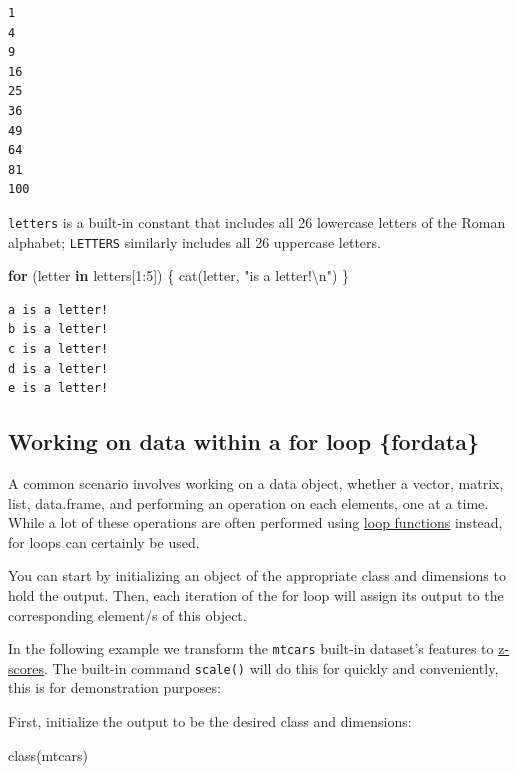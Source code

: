 \documentclass[
]{book}
\newenvironment{Shaded}{\begin{snugshade}}{\end{snugshade}}
\newcommand{\ControlFlowTok}[1]{\textcolor[rgb]{0.13,0.29,0.53}{\textbf{#1}}}
\newcommand{\DecValTok}[1]{\textcolor[rgb]{0.00,0.00,0.81}{#1}}
\newcommand{\FunctionTok}[1]{\textcolor[rgb]{0.00,0.00,0.00}{#1}}
\newcommand{\NormalTok}[1]{#1}
\newcommand{\SpecialCharTok}[1]{\textcolor[rgb]{0.00,0.00,0.00}{#1}}
\newcommand{\StringTok}[1]{\textcolor[rgb]{0.31,0.60,0.02}{#1}}
\begin{document}
\begin{verbatim}
1 
4 
9 
16 
25 
36 
49 
64 
81 
100 
\end{verbatim}

\texttt{letters} is a built-in constant that includes all 26 lowercase letters of the Roman alphabet; \texttt{LETTERS} similarly includes all 26 uppercase letters.

\begin{Shaded}
\begin{Highlighting}[]
\ControlFlowTok{for}\NormalTok{ (letter }\ControlFlowTok{in}\NormalTok{ letters[}\DecValTok{1}\SpecialCharTok{:}\DecValTok{5}\NormalTok{]) \{}
  \FunctionTok{cat}\NormalTok{(letter, }\StringTok{"is a letter!}\SpecialCharTok{\textbackslash{}n}\StringTok{"}\NormalTok{)}
\NormalTok{\}}
\end{Highlighting}
\end{Shaded}

\begin{verbatim}
a is a letter!
b is a letter!
c is a letter!
d is a letter!
e is a letter!
\end{verbatim}

\hypertarget{working-on-data-within-a-for-loop-fordata}{%
\subsection{Working on data within a for loop \{fordata\}}\label{working-on-data-within-a-for-loop-fordata}}

A common scenario involves working on a data object, whether a vector, matrix, list, data.frame, and performing an operation on each elements, one at a time. While a lot of these operations are often performed using \protect\hyperlink{loopfns}{loop functions} instead, for loops can certainly be used.

You can start by initializing an object of the appropriate class and dimensions to hold the output. Then, each iteration of the for loop will assign its output to the corresponding element/s of this object.

In the following example we transform the \texttt{mtcars} built-in dataset's features to \protect\hyperlink{zscore}{z-scores}.
The built-in command \texttt{scale()} will do this for quickly and conveniently, this is for demonstration purposes:

First, initialize the output to be the desired class and dimensions:

\begin{Shaded}
\begin{Highlighting}[]
\FunctionTok{class}\NormalTok{(mtcars)}
\end{Highlighting}
\end{Shaded}
\end{document}
